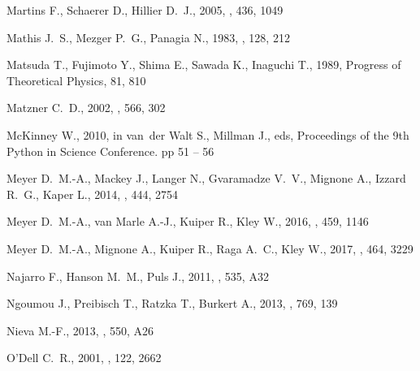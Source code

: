 \documentclass[useAMS, usenatbib, a4paper]{mnras}
\begin{document}
\begin{thebibliography}{}
{Martins} F.,  {Schaerer} D.,   {Hillier} D.~J.,  2005, \aap, 436, 1049

{Mathis} J.~S.,  {Mezger} P.~G.,   {Panagia} N.,  1983, \aap, 128, 212

{Matsuda} T.,  {Fujimoto} Y.,  {Shima} E.,  {Sawada} K.,   {Inaguchi} T.,
  1989, Progress of Theoretical Physics, 81, 810

{Matzner} C.~D.,  2002, \apj, 566, 302

McKinney W.,  2010, in van~der Walt S.,  Millman J.,  eds, Proceedings of the
  9th Python in Science Conference. pp 51 -- 56

{Meyer} D.~M.-A.,  {Mackey} J.,  {Langer} N.,  {Gvaramadze} V.~V.,  {Mignone}
  A.,  {Izzard} R.~G.,   {Kaper} L.,  2014, \mnras, 444, 2754

{Meyer} D.~M.-A.,  {van Marle} A.-J.,  {Kuiper} R.,   {Kley} W.,  2016, \mnras,
  459, 1146

{Meyer} D.~M.-A.,  {Mignone} A.,  {Kuiper} R.,  {Raga} A.~C.,   {Kley} W.,
  2017, \mnras, 464, 3229

{Najarro} F.,  {Hanson} M.~M.,   {Puls} J.,  2011, \aap, 535, A32

{Ngoumou} J.,  {Preibisch} T.,  {Ratzka} T.,   {Burkert} A.,  2013, \apj, 769,
  139

{Nieva} M.-F.,  2013, \aap, 550, A26

{O'Dell} C.~R.,  2001, \aj, 122, 2662


\end{thebibliography}
\end{document}
